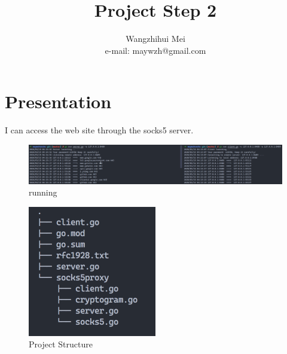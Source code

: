 \documentclass[a4paper,10pt]{article}
\begin{document}
%
   \title{Project Step 2}

   \author{Wangzhihui Mei \\ e-mail: maywzh@gmail.com}
          
   \date{}

   \maketitle
   
  \newpage
    
\section*{Presentation}
  I can access the web site through the socks5 server.

  \begin{figure}[h]
    \centering
    \includegraphics[width=1.0\textwidth]{image/img1.png}
    \caption{running}
  \end{figure}

  \begin{figure}[h]
    \centering
    \includegraphics[width=0.5\textwidth]{image/tree.png}
    \caption{Project Structure}
  \end{figure}
\end{document}
